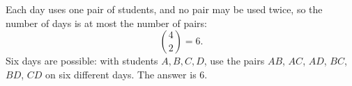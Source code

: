 Each day uses one pair of students, and no pair may be used twice, so the number of days is at most the number of pairs:
\[\binom42=6 .\]
Six days are possible: with students $A,B,C,D$, use the pairs $AB$, $AC$, $AD$, $BC$, $BD$, $CD$ on six different days. The answer is $\boxed{6}$.
